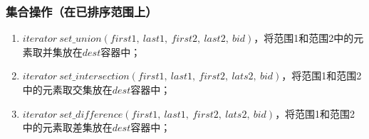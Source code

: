 \subsubsection{集合操作（在已排序范围上）}
\begin{enumerate}
    \item $iterator\ set\_union(first1, \ last1,\ first2,\ last2,\ bid)$，将范围1和范围2中的元素取并集放在$dest$容器中；
    \item $iterator\ set\_intersection(first1,\ last1,\ first2,\ lats2,\ bid)$，将范围1和范围2中的元素取交集放在$dest$容器中；
    \item $iterator\ set\_difference(first1,\ last1,\ first2,\ lats2,\ bid)$，将范围1和范围2中的元素取差集放在$dest$容器中；
\end{enumerate}